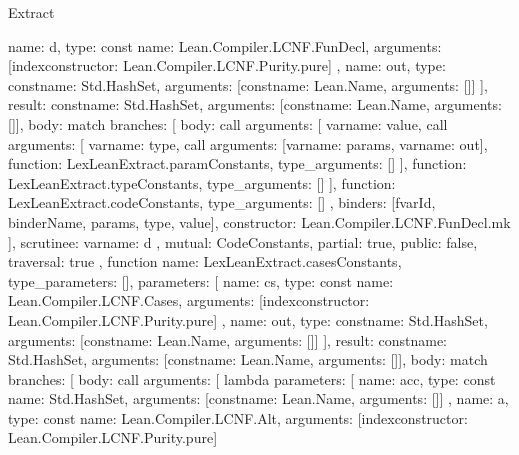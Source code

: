 \begin{lexlean}{Extract}
\begin{toolingmodule}
{{        {
          name: d,
          type: const{
            name: Lean.Compiler.LCNF.FunDecl,
            arguments: [index{constructor: Lean.Compiler.LCNF.Purity.pure}]
          }
        },
        {
          name: out,
          type: const{name: Std.HashSet, arguments: [const{name: Lean.Name, arguments: []}]}
        }
      ],
      result: const{name: Std.HashSet, arguments: [const{name: Lean.Name, arguments: []}]},
      body: match{
        branches: [
          {
            body: call{
              arguments: [
                var{name: value},
                call{
                  arguments: [
                    var{name: type},
                    call{
                      arguments: [var{name: params}, var{name: out}],
                      function: LexLeanExtract.paramConstants,
                      type_arguments: []
                    }
                  ],
                  function: LexLeanExtract.typeConstants,
                  type_arguments: []
                }
              ],
              function: LexLeanExtract.codeConstants,
              type_arguments: []
            },
            binders: [fvarId, binderName, params, type, value],
            constructor: Lean.Compiler.LCNF.FunDecl.mk
          }
        ],
        scrutinee: var{name: d}
      },
      mutual: CodeConstants,
      partial: true,
      public: false,
      traversal: true
    },
    function{
      name: LexLeanExtract.casesConstants,
      type_parameters: [],
      parameters: [
        {
          name: cs,
          type: const{
            name: Lean.Compiler.LCNF.Cases,
            arguments: [index{constructor: Lean.Compiler.LCNF.Purity.pure}]
          }
        },
        {
          name: out,
          type: const{name: Std.HashSet, arguments: [const{name: Lean.Name, arguments: []}]}
        }
      ],
      result: const{name: Std.HashSet, arguments: [const{name: Lean.Name, arguments: []}]},
      body: match{
        branches: [
          {
            body: call{
              arguments: [
                lambda{
                  parameters: [
                    {
                      name: acc,
                      type: const{
                        name: Std.HashSet,
                        arguments: [const{name: Lean.Name, arguments: []}]
                      }
                    },
                    {
                      name: a,
                      type: const{
                        name: Lean.Compiler.LCNF.Alt,
                        arguments: [index{constructor: Lean.Compiler.LCNF.Purity.pure}]
                      }
}}}}}}}
\end{toolingmodule}
\end{lexlean}
